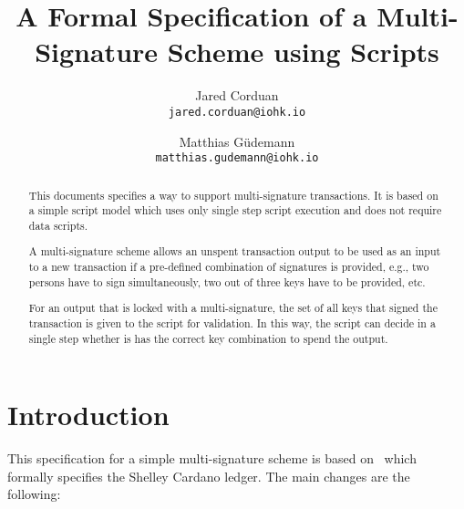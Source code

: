 \documentclass[11pt,a4paper,dvipsnames]{article}
\theoremstyle{definition}
\begin{document}

\title{A Formal Specification of a Multi-Signature Scheme using Scripts}

\author{Jared Corduan  \\ {\small \texttt{jared.corduan@iohk.io}} \\
   \and Matthias G\"udemann  \\ {\small \texttt{matthias.gudemann@iohk.io}}}


\maketitle

\begin{abstract}
  This documents specifies a way to support multi-signature transactions. It is
  based on a simple script model which uses only single step script execution
  and does not require data scripts.

  A multi-signature scheme allows an unspent transaction output to be used as an
  input to a new transaction if a pre-defined combination of signatures is
  provided, e.g., two persons have to sign simultaneously, two out of three
  keys have to be provided, etc.

  For an output that is locked with a multi-signature, the set of all keys that
  signed the transaction is given to the script for validation. In this way, the
  script can decide in a single step whether is has the correct key combination
  to spend the output.
\end{abstract}



\section{Introduction}
\label{sec:introduction}

This specification for a simple multi-signature scheme is based
on~\cite{shelley_formal_spec} which formally specifies the Shelley Cardano
ledger. The main changes are the following:
\end{document}
